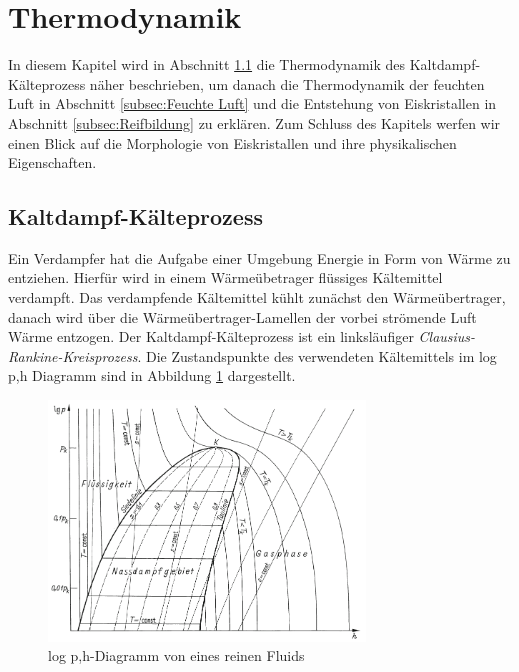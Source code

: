 \section{Thermodynamik }
\label{sec:Thermodynamik}

In diesem Kapitel wird in Abschnitt \ref{subsec:Kaltdampf-Kaelteprozess} die Thermodynamik des Kaltdampf-Kälteprozess näher beschrieben, um danach die Thermodynamik der feuchten Luft in Abschnitt \ref{subsec:Feuchte Luft} und die Entstehung von Eiskristallen in Abschnitt \ref{subsec:Reifbildung} zu erklären. Zum Schluss des Kapitels werfen wir einen Blick auf die Morphologie von Eiskristallen und ihre physikalischen Eigenschaften.


\subsection{Kaltdampf-Kälteprozess}
\label{subsec:Kaltdampf-Kaelteprozess}



Ein Verdampfer hat die Aufgabe einer Umgebung Energie in Form von Wärme zu entziehen. Hierfür wird in einem Wärmeübetrager flüssiges Kältemittel verdampft. Das verdampfende Kältemittel kühlt zunächst den Wärmeübertrager, danach wird über die Wärmeübertrager-Lamellen der vorbei strömende Luft Wärme entzogen.
Der Kaltdampf-Kälteprozess ist ein linksläufiger \textit{Clausius-Rankine-Kreisprozess}. Die Zustandspunkte des verwendeten Kältemittels im log p,h Diagramm sind in Abbildung \ref{fig:Schema p-h-Diagramm} dargestellt. 

\begin{figure}[htb]
\centering		
\includegraphics[width=0.75\textwidth]{Pictures/log_p_h_Beahr_Schema.png}
\caption{log p,h-Diagramm von eines reinen Fluids  \citep{Baehr2013}}
\label{fig:Schema p-h-Diagramm}
\end{figure}

